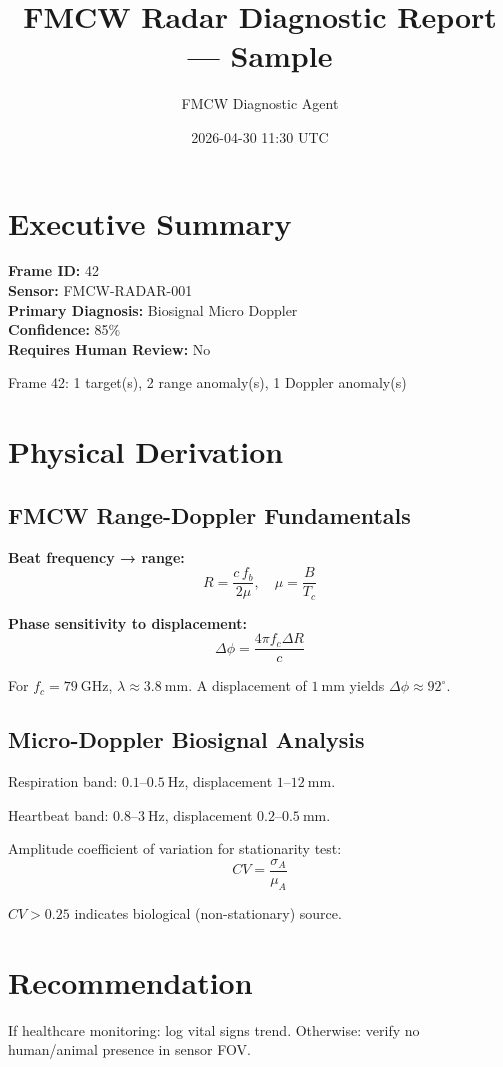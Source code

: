 \documentclass[11pt,a4paper]{article}
\title{FMCW Radar Diagnostic Report — Sample}
\author{FMCW Diagnostic Agent}
\date{2026-04-30 11:30 UTC}
\begin{document}
\maketitle

\section{Executive Summary}

\textbf{Frame ID:} 42 \\
\textbf{Sensor:} FMCW-RADAR-001 \\
\textbf{Primary Diagnosis:} Biosignal Micro Doppler \\
\textbf{Confidence:} 85\% \\
\textbf{Requires Human Review:} No

\bigskip
\noindent Frame 42: 1 target(s), 2 range anomaly(s), 1 Doppler anomaly(s)

\section{Physical Derivation}

\subsection*{FMCW Range-Doppler Fundamentals}

\textbf{Beat frequency → range:}
\begin{equation}
  R = \frac{c \, f_b}{2 \mu}, \quad \mu = \frac{B}{T_c}
  \label{eq:range}
\end{equation}

\textbf{Phase sensitivity to displacement:}
\begin{equation}
  \Delta\phi = \frac{4\pi f_c \Delta R}{c}
  \label{eq:phase}
\end{equation}

For $f_c = 79\ \mathrm{GHz}$, $\lambda \approx 3.8\ \mathrm{mm}$.
A displacement of $1\ \mathrm{mm}$ yields $\Delta\phi \approx 92^\circ$.

\subsection*{Micro-Doppler Biosignal Analysis}

Respiration band: $0.1\text{--}0.5\ \mathrm{Hz}$, displacement $1\text{--}12\ \mathrm{mm}$.

Heartbeat band: $0.8\text{--}3\ \mathrm{Hz}$, displacement $0.2\text{--}0.5\ \mathrm{mm}$.

Amplitude coefficient of variation for stationarity test:
\begin{equation}
  CV = \frac{\sigma_A}{\mu_A}
\end{equation}

$CV > 0.25$ indicates biological (non-stationary) source.

\section{Recommendation}

If healthcare monitoring: log vital signs trend. Otherwise: verify no human/animal
presence in sensor FOV.
\end{document}
